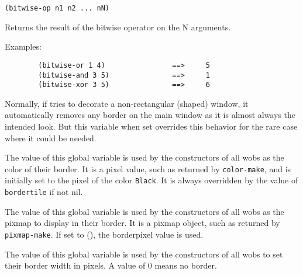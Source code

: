         
{\usagefont\begin{verbatim}
(bitwise-op n1 n2 ... nN)
\end{verbatim}}\usageupspace

Returns the result of the bitwise operator on the N arguments.

{Examples:\exemplefont\upspace\begin{verbatim}
        (bitwise-or 1 4)                ==>     5
        (bitwise-and 3 5)               ==>     1
        (bitwise-xor 3 5)               ==>     6
\end{verbatim}}



Normally, if {\GWM} tries to decorate a non-rectangular (shaped) window, it
automatically removes any border on the main window as it is almost always the
intended look. But this variable when set overrides this behavior for the rare
case where it could be needed.

        

The value of this global variable is used by the constructors of all wobs as
the color of their border. It is a pixel value, such as returned by
\verb"color-make", and is initially set to the pixel of the color
\verb"Black". It is always overridden by the value of \verb"bordertile" if
not nil.

        

The value of this global variable is used by the constructors of all wobs as
the pixmap to display in their border. It is a pixmap object, such as
returned by \verb"pixmap-make". If set to (), the borderpixel value is used.

        

The value of this global variable is used by the constructors of all wobs to
set their border width in pixels. A value of 0 means no border.

        
